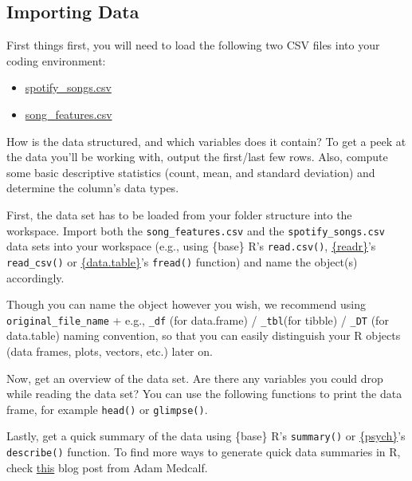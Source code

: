 \documentclass[
  11pt,
]{book}
\providecommand{\tightlist}{%
  \setlength{\itemsep}{0pt}\setlength{\parskip}{0pt}}
\newenvironment{tips}[1]
  {
  \begin{itemize}
  \footnotesize
  \renewcommand{\labelitemi}{
    \raisebox{-.7\height}[0pt][0pt]{
      {\setkeys{Gin}{width=3em,keepaspectratio}
        \texttt{[image: images/\#1.png]}}
    }
  }
  \setlength{\fboxsep}{1em}
  \begin{rbox}
  \item
  }
  {
  \end{rbox}
  \end{itemize}
  }
\begin{document}
\hypertarget{importing-data}{%
\subsection{Importing Data}\label{importing-data}}

First things first, you will need to load the following two CSV files into your coding environment:

\begin{itemize}
\tightlist
\item
  \href{https://drive.google.com/uc?export=download\&id=1OmFrdUaPFatpPLRikLJHS-VoF1F27G73}{spotify\_songs.csv}
\item
  \href{https://drive.google.com/uc?export=download\&id=1gHO566_qxBbz7t8fcH10uVQDAmxK33IF}{song\_features.csv}
\end{itemize}

How is the data structured, and which variables does it contain? To get a peek at the data you'll be working with, output the first/last few rows. Also, compute some basic descriptive statistics (count, mean, and standard deviation) and determine the column's data types.

\begin{tips}r

First, the data set has to be loaded from your folder structure into the workspace. Import both the \texttt{song\_features.csv} and the \texttt{spotify\_songs.csv} data sets into your workspace (e.g., using \{base\} R's \texttt{read.csv()}, \href{https://readr.tidyverse.org}{\{readr\}}'s \texttt{read\_csv()} or \href{https://rdatatable.gitlab.io/data.table/}{\{data.table\}}'s \texttt{fread()} function) and name the object(s) accordingly.

Though you can name the object however you wish, we recommend using \texttt{original\_file\_name} + e.g., \texttt{\_df} (for data.frame) / \texttt{\_tbl}(for tibble) / \texttt{\_DT} (for data.table) naming convention, so that you can easily distinguish your R objects (data frames, plots, vectors, etc.) later on.

Now, get an overview of the data set. Are there any variables you could drop while reading the data set? You can use the following functions to print the data frame, for example \texttt{head()} or \texttt{glimpse()}.

Lastly, get a quick summary of the data using \{base\} R's \texttt{summary()} or \href{https://personality-project.org/r/psych/}{\{psych\}}'s \texttt{describe()} function.
To find more ways to generate quick data summaries in R, check \href{https://dabblingwithdata.wordpress.com/2018/01/02/my-favourite-r-package-for-summarising-data/}{this} blog post from Adam Medcalf.

\end{tips}
\end{document}
